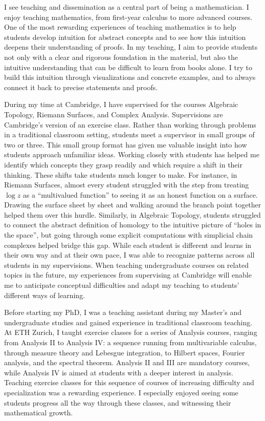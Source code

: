 I see teaching and dissemination as a central part of being a mathematician. I enjoy teaching mathematics, from first-year calculus to more advanced courses. One of the most rewarding experiences of teaching mathematics is to help students develop intuition for abstract concepts and to see how this intuition deepens their understanding of proofs. In my teaching, I aim to provide students not only with a clear and rigorous foundation in the material, but also the intuitive understanding that can be difficult to learn from books alone.
{I try to build this intuition through visualizations and concrete examples, and to always connect it back to precise statements and proofs.}

During my time at Cambridge,
I have {supervised} for the courses Algebraic Topology,
Riemann Surfaces, and Complex Analysis.
Supervisions are Cambridge's version of an exercise class.
Rather than working through problems in a traditional classroom setting,
students meet a supervisor in small groups of two or three.
This small group format has given me valuable insight into how students approach unfamiliar ideas.
Working closely with students has helped me identify which concepts they grasp readily and which require a shift in their thinking.
These shifts take students much longer to make.
For instance, in Riemann Surfaces, almost every student struggled with the step from treating $\log z$ as a ``multivalued function'' to seeing it as an honest function on a surface. Drawing the surface sheet by sheet and walking around the branch point together helped them over this hurdle.
Similarly, in Algebraic Topology, students struggled to connect the abstract definition of homology to the intuitive picture of ``holes in the space'', but going through some explicit computations with simplicial chain complexes helped bridge this gap.
While each student is different and learns in their own way and at their own pace,
I was able to recognize patterns across all students in my supervisions.
When teaching undergraduate courses on related topics in the future, my experiences from supervising at Cambridge will enable me to anticipate conceptual difficulties and adapt my teaching to students' different ways of learning.

Before starting my PhD, I was a teaching assistant during my Master's and
undergraduate studies and gained experience in traditional classroom
teaching.
At ETH Zurich, I taught exercise
classes for a series of
Analysis courses,
ranging from Analysis II to Analysis IV: a sequence running from multivariable calculus, through measure theory and Lebesgue integration, to Hilbert spaces, Fourier analysis, and the spectral theorem.
Analysis II and III are mandatory courses, while Analysis IV is aimed at students with a deeper interest in analysis.
Teaching exercise classes for this sequence of courses of increasing difficulty and
specialization was a rewarding experience.
I especially enjoyed seeing some students progress all the way through these classes,
and witnessing their mathematical growth.

